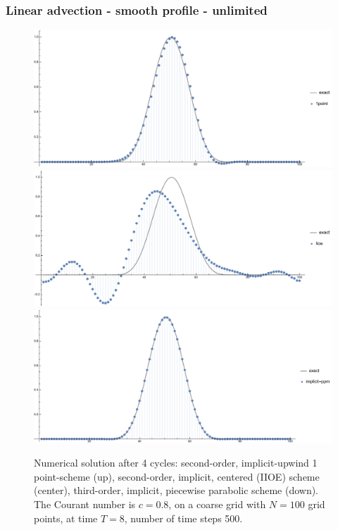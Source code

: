 \documentclass[../thesis.tex]{subfiles}
\begin{document}
\subsubsection{Linear advection - smooth profile - unlimited}
\begin{figure}[H]
	\centering
	\includegraphics[width=\textwidth]{fig-1point-c0p8-T8-limit0-smooth.pdf}
	\includegraphics[width=\textwidth]{fig-iioe-c0p8-T8-limit0-smooth.pdf}
	\includegraphics[width=\textwidth]{fig-implicit-ppm-c0p8-T8-limit0-smooth.pdf}
	\caption{Numerical solution after 4 cycles: second-order, implicit-upwind 1 point-scheme (up), second-order, implicit, centered (IIOE) scheme (center), third-order, implicit, piecewise parabolic scheme (down). The Courant number is \(c = 0.8\), on a coarse grid with \(N = 100\) grid points, at time \(T = 8\), number of time steps 500.}
	\label{fig:c0p8-T8-limit0-smooth}
\end{figure}
\end{document}
